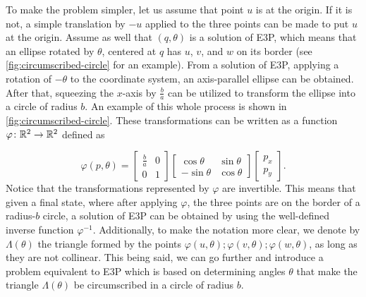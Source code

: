 To make the problem simpler, let us assume that point $u$ is at the origin. If it is not, a simple translation by $-u$ applied to the three points can be made to put $u$ at the origin.
Assume as well that $(q, \theta)$ is a solution of E3P, which means that an ellipse rotated by $\theta$, centered at $q$ has $u$, $v$, and $w$ on its border (see \autoref{fig:circumscribed-circle} for an example).
From a solution of E3P, applying a rotation of $-\theta$ to the coordinate system, an axis-parallel ellipse can be obtained.
After that, squeezing the $x$-axis by $\frac{b}{a}$ can be utilized to transform the ellipse into a circle of radius $b$. An example of this whole process is shown in \autoref{fig:circumscribed-circle}. These transformations can be written as a function $\varphi\colon \mathbb{R}^2 \to \mathbb{R}^2$ defined as

\begin{equation}\label{eq:trpnts}
\varphi(p, \theta)=\left[\begin{array}{cc}
\frac{b}{a}&0\\
0&1
\end{array}\right]
\left[\begin{array}{cc}
\cos{\theta}&\sin{\theta}\\
-\sin{\theta}&\cos{\theta}
\end{array}\right]\left[\begin{array}{c}
p_x\\
p_y
\end{array}\right].
\end{equation}
Notice that the transformations represented by $\varphi$ are invertible. This means that given a final state, where after applying $\varphi$, the three points are on the border of a radius-$b$ circle, a solution of E3P can be obtained by using the well-defined inverse function $\varphi^{-1}$.
Additionally, to make the notation more clear, we denote by $\Lambda(\theta)$ the triangle formed by the points $\varphi(u,\theta); \varphi(v, \theta); \varphi(w, \theta)$, as long as they are not collinear. 
This being said, we can go further and introduce a problem equivalent to E3P which is based on determining angles $\theta$ that make the triangle $\Lambda(\theta)$ be circumscribed in a circle of radius $b$.


